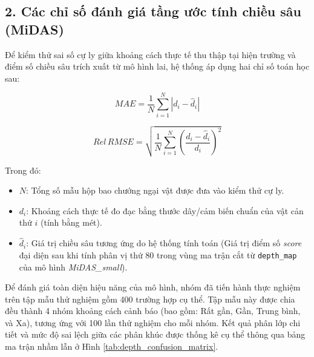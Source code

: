 \subsection*{2. Các chỉ số đánh giá tầng ước tính chiều sâu (MiDAS)}

Để kiểm thử sai số cự ly giữa khoảng cách thực tế thu thập tại hiện trường và điểm số chiều sâu trích xuất từ mô hình lai, hệ thống áp dụng hai chỉ số toán học sau:

\begin{equation}
MAE = \frac{1}{N} \sum_{i=1}^{N} \left| d_i - \hat{d}_i \right|
\end{equation}

\begin{equation}
Rel\,RMSE = \sqrt{\frac{1}{N} \sum_{i=1}^{N} \left( \frac{d_i - \hat{d}_i}{d_i} \right)^2}
\end{equation}

Trong đó:
\begin{itemize}
    \item $N$: Tổng số mẫu hộp bao chướng ngại vật được đưa vào kiểm thử cự ly.
    \item $d_i$: Khoảng cách thực tế đo đạc bằng thước dây/cảm biến chuẩn của vật cản thứ $i$ (tính bằng mét).
    \item $\hat{d}_i$: Giá trị chiều sâu tương ứng do hệ thống tính toán (Giá trị điểm số \textit{score} đại diện sau khi tính phân vị thứ 80 trong vùng ma trận cắt từ \texttt{depth\_map} của mô hình \textit{MiDAS\_small}).
\end{itemize}

Để đánh giá toàn diện hiệu năng của mô hình, nhóm đã tiến hành thực nghiệm trên tập mẫu thử nghiệm gồm 400 trường hợp cụ thể. Tập mẫu này được chia đều thành 4 nhóm khoảng cách cảnh báo (bao gồm: Rất gần, Gần, Trung bình, và Xa), tương ứng với 100 lần thử nghiệm cho mỗi nhóm. Kết quả phân lớp chi tiết và mức độ sai lệch giữa các phân khúc được thống kê cụ thể thông qua bảng ma trận nhầm lẫn ở Hình \ref{tab:depth_confusion_matrix}.

